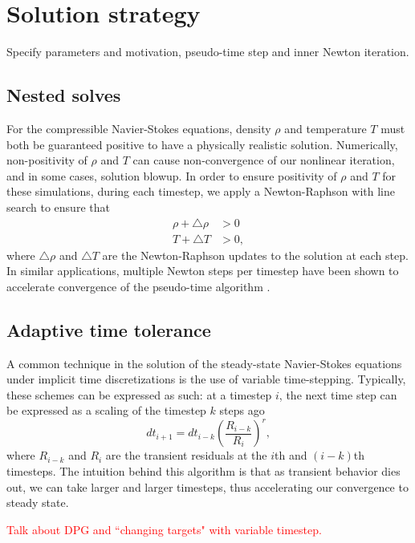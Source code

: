 \documentclass[11pt,onecolumn]{scrartcl}
\newcommand{\LRp}[1]{\left( #1 \right)}
\begin{document}
\section{Solution strategy}

Specify parameters and motivation, pseudo-time step and inner Newton iteration.  

\subsection{Nested solves}

For the compressible Navier-Stokes equations, density $\rho$ and temperature $T$ must both be guaranteed positive to have a physically realistic solution.  Numerically, non-positivity of $\rho$ and $T$ can cause non-convergence of our nonlinear iteration, and in some cases, solution blowup.  In order to ensure positivity of $\rho$ and $T$ for these simulations, during each timestep, we apply a Newton-Raphson with line search to ensure that 
\begin{align*}
\rho + \triangle \rho &> 0\\
T + \triangle T &> 0,
\end{align*}
where $\triangle \rho$ and $\triangle T$ are the Newton-Raphson updates to the solution at each step.  In similar applications, multiple Newton steps per timestep have been shown to accelerate convergence of the pseudo-time algorithm \cite{kirkThesis}.  

\subsection{Adaptive time tolerance}

A common technique in the solution of the steady-state Navier-Stokes equations under implicit time discretizations is the use of variable time-stepping.  Typically, these schemes can be expressed as such: at a timestep $i$, the next time step can be expressed as a scaling of the timestep $k$ steps ago
\[
dt_{i+1} = dt_{i-k} \LRp{\frac{R_{i-k}}{R_i}}^r,
\]
where $R_{i-k}$ and $R_i$ are the transient residuals at the $i$th and $(i-k)$th timesteps.  The intuition behind this algorithm is that as transient behavior dies out, we can take larger and larger timesteps, thus accelerating our convergence to steady state.  

\textcolor{red}{Talk about DPG and ``changing targets" with variable timestep.}



\end{document}
